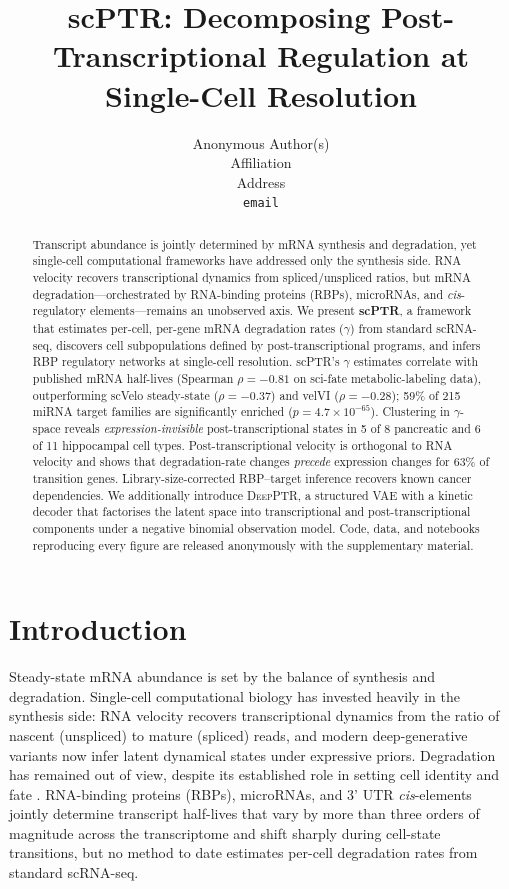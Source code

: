 \documentclass{article}
\title{scPTR: Decomposing Post-Transcriptional Regulation at Single-Cell Resolution}
\author{Anonymous Author(s) \\ Affiliation \\ Address \\ \texttt{email}}
\begin{document}
\maketitle

\begin{abstract}
Transcript abundance is jointly determined by mRNA synthesis and degradation, yet single-cell computational frameworks have addressed only the synthesis side. RNA velocity recovers transcriptional dynamics from spliced/unspliced ratios, but mRNA degradation---orchestrated by RNA-binding proteins (RBPs), microRNAs, and \textit{cis}-regulatory elements---remains an unobserved axis. We present \textbf{scPTR}, a framework that estimates per-cell, per-gene mRNA degradation rates ($\gamma$) from standard scRNA-seq, discovers cell subpopulations defined by post-transcriptional programs, and infers RBP regulatory networks at single-cell resolution. scPTR's $\gamma$ estimates correlate with published mRNA half-lives (Spearman $\rho{=}{-}0.81$ on sci-fate metabolic-labeling data), outperforming scVelo steady-state ($\rho{=}{-}0.37$) and velVI ($\rho{=}{-}0.28$); 59\% of 215 miRNA target families are significantly enriched ($p{=}4.7{\times}10^{-65}$). Clustering in $\gamma$-space reveals \textit{expression-invisible} post-transcriptional states in 5 of 8 pancreatic and 6 of 11 hippocampal cell types. Post-transcriptional velocity is orthogonal to RNA velocity and shows that degradation-rate changes \textit{precede} expression changes for 63\% of transition genes. Library-size-corrected RBP--target inference recovers known cancer dependencies. We additionally introduce \textsc{DeepPTR}, a structured VAE with a kinetic decoder that factorises the latent space into transcriptional and post-transcriptional components under a negative binomial observation model. Code, data, and notebooks reproducing every figure are released anonymously with the supplementary material.
\end{abstract}

\section{Introduction}

Steady-state mRNA abundance is set by the balance of synthesis and degradation. Single-cell computational biology has invested heavily in the synthesis side: RNA velocity \cite{lamanno2018} recovers transcriptional dynamics from the ratio of nascent (unspliced) to mature (spliced) reads, and modern deep-generative variants \cite{gayoso2024,gao2022} now infer latent dynamical states under expressive priors. Degradation has remained out of view, despite its established role in setting cell identity and fate \cite{hentze2018}. RNA-binding proteins (RBPs), microRNAs, and 3' UTR \textit{cis}-elements jointly determine transcript half-lives that vary by more than three orders of magnitude across the transcriptome and shift sharply during cell-state transitions, but no method to date estimates per-cell degradation rates from standard scRNA-seq.
\end{document}

